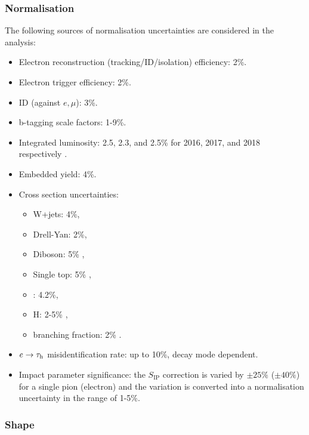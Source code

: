 \subsubsection{Normalisation}
The following sources of normalisation uncertainties are considered in the analysis:
\begin{itemize}
    \item Electron reconstruction (tracking/ID/isolation) efficiency: 2\%.
    \item Electron trigger efficiency: 2\%.
    \item \tauh ID (against $e,\mu$): 3\%.
    \item b-tagging scale factors: 1-9\%.
    \item Integrated luminosity: 2.5, 2.3, and 2.5\% for 2016, 2017, and 2018 respectively \cite{CMS:2017sdi, CMS:2018elu,CMS:2019jhq}.
    \item Embedded yield: 4\%.
    \item Cross section uncertainties:
    \begin{itemize}
        \item W+jets: 4\%,
        \item Drell-Yan: 2\%,
        \item Diboson: 5\% \cite{CMS:2016jdy},
        \item Single top: 5\% \cite{CMS:2016lel},
        \item \ttbar: 4.2\%,
        \item H: 2-5\% \cite{LHCHiggsCrossSectionWorkingGroup:2016ypw},
        \item \htt branching fraction: 2\% \cite{LHCHiggsCrossSectionWorkingGroup:2016ypw}.
    \end{itemize}
    \item $e\to\tau_\mathrm{h}$ misidentification rate: up to 10\%, decay mode dependent. 
    \item Impact parameter significance: the $S_\text{IP}$ correction is varied by $\pm25\%$ ($\pm40\%$) for a single pion (electron) and the variation is converted into a normalisation uncertainty in the range of 1-5\%.
\end{itemize}

\subsubsection{Shape}

